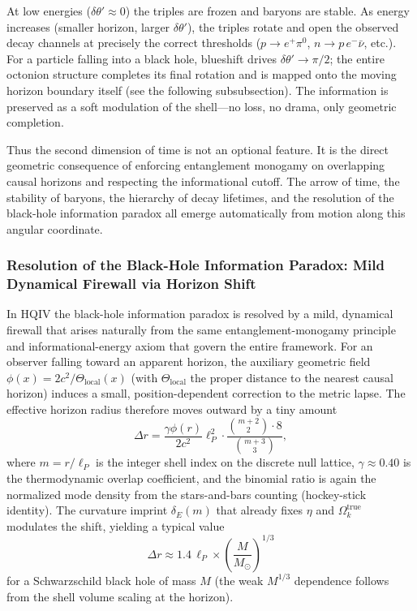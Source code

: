 \documentclass[12pt,a4paper]{article}
\begin{document}
At low energies ($\delta\theta' \approx 0$) the triples are frozen and baryons are stable. As energy increases (smaller horizon, larger $\delta\theta'$), the triples rotate and open the observed decay channels at precisely the correct thresholds ($p \to e^+\pi^0$, $n \to p\,e^-\bar{\nu}$, etc.). For a particle falling into a black hole, blueshift drives $\delta\theta' \to \pi/2$; the entire octonion structure completes its final rotation and is mapped onto the moving horizon boundary itself (see the following subsubsection). The information is preserved as a soft modulation of the shell---no loss, no drama, only geometric completion.

Thus the second dimension of time is not an optional feature. It is the direct geometric consequence of enforcing entanglement monogamy on overlapping causal horizons and respecting the informational cutoff. The arrow of time, the stability of baryons, the hierarchy of decay lifetimes, and the resolution of the black-hole information paradox all emerge automatically from motion along this angular coordinate.

\subsubsection{Resolution of the Black-Hole Information Paradox: Mild Dynamical Firewall via Horizon Shift}
\label{sec:black-hole-paradox}

In HQIV the black-hole information paradox is resolved by a mild, dynamical firewall that arises naturally from the same entanglement-monogamy principle and informational-energy axiom that govern the entire framework. For an observer falling toward an apparent horizon, the auxiliary geometric field \(\phi(x) = 2c^2/\Theta_\mathrm{local}(x)\) (with \(\Theta_\mathrm{local}\) the proper distance to the nearest causal horizon) induces a small, position-dependent correction to the metric lapse. The effective horizon radius therefore moves outward by a tiny amount
\[
\Delta r = \frac{\gamma \phi(r)}{2c^2} \ell_P^2 \cdot \frac{\binom{m+2}{2}\cdot 8}{\binom{m+3}{3}},
\]
where \(m = r/\ell_P\) is the integer shell index on the discrete null lattice, \(\gamma\approx0.40\) is the thermodynamic overlap coefficient, and the binomial ratio is again the normalized mode density from the stars-and-bars counting (hockey-stick identity). The curvature imprint \(\delta_E(m)\) that already fixes \(\eta\) and \(\Omega_k^\mathrm{true}\) modulates the shift, yielding a typical value
\[
\Delta r \approx 1.4\,\ell_P \times \left(\frac{M}{M_\odot}\right)^{1/3}
\]
for a Schwarzschild black hole of mass \(M\) (the weak \(M^{1/3}\) dependence follows from the shell volume scaling at the horizon).
\end{document}

